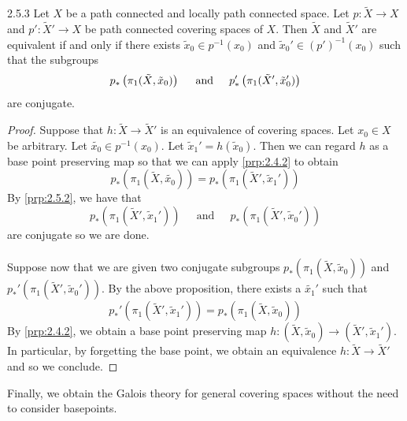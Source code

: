 \documentclass[a4paper]{article}
\begin{document}
\begin{prp}{}{2.5.3} Let $X$ be a path connected and locally path connected space. Let $p:\tilde{X}\to X$ and $p':\tilde{X}'\to X$ be path connected covering spaces of $X$. Then $\tilde{X}$ and $\tilde{X}'$ are equivalent if and only if there exists $\tilde{x}_0\in p^{-1}(x_0)$ and $\tilde{x}_0'\in (p')^{-1}(x_0)$ such that the subgroups $$p_\ast\left(\pi_1(\tilde{X},\tilde{x}_0)\right)\text{\;\;\;\; and \;\;\;\;}p_\ast'\left(\pi_1(\tilde{X}',\tilde{x}_0')\right)$$ are conjugate. \tcbline
\begin{proof}
Suppose that $h:\tilde{X}\to\tilde{X}'$ is an equivalence of covering spaces. Let $x_0\in X$ be arbitrary. Let $\tilde{x_0}\in p^{-1}(x_0)$. Let $\tilde{x}_1'=h(\tilde{x}_0)$. Then we can regard $h$ as a base point preserving map so that we can apply \ref{prp:2.4.2} to obtain $$p_\ast(\pi_1(\tilde{X},\tilde{x_0}))=p_\ast(\pi_1(\tilde{X}',\tilde{x}_1'))$$ By \ref{prp:2.5.2}, we have that $$p_\ast(\pi_1(\tilde{X}',\tilde{x}_1'))\;\;\;\;\text{ and }\;\;\;\;p_\ast(\pi_1(\tilde{X}',\tilde{x}_0'))$$ are conjugate so we are done. \\~\\

Suppose now that we are given two conjugate subgroups $p_\ast\left(\pi_1(\tilde{X},\tilde{x}_0)\right)$ and $p_\ast'\left(\pi_1(\tilde{X}',\tilde{x}_0')\right)$. By the above proposition, there exists a $\tilde{x_1}'$ such that $$p_\ast'\left(\pi_1(\tilde{X}',\tilde{x}_1')\right)=p_\ast\left(\pi_1(\tilde{X},\tilde{x}_0)\right)$$ By \ref{prp:2.4.2}, we obtain a base point preserving map $h:(\tilde{X},\tilde{x}_0)\to(\tilde{X}',\tilde{x}_1')$. In particular, by forgetting the base point, we obtain an equivalence $h:\tilde{X}\to\tilde{X}'$ and so we conclude. 
\end{proof}
\end{prp}

Finally, we obtain the Galois theory for general covering spaces without the need to consider basepoints. 
\end{document}
